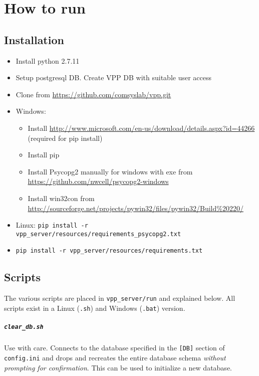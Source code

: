 


\chapter{How to run} \label{ch:how_to_run}

\section{Installation}

\begin{itemize}
	\item Install python 2.7.11
	\item Setup postgresql DB. Create VPP DB with suitable user access
	\item Clone from \url{https://github.com/comsyslab/vpp.git}


	\item Windows:
	\begin{itemize}
		\item Install \url{http://www.microsoft.com/en-us/download/details.aspx?id=44266} (required for pip install)
		\item Install pip
		\item Install Psycopg2 manually for windows with exe from \url{https://github.com/nwcell/psycopg2-windows}
		\item Install win32con from \url{http://sourceforge.net/projects/pywin32/files/pywin32/Build%20220/}
	\end{itemize}

	\item Linux: \texttt{pip install -r vpp\_server/resources/requirements\_psycopg2.txt}


	\item \texttt{pip install -r vpp\_server/resources/requirements.txt}
\end{itemize}


\section{Scripts}
The various scripts are placed in \texttt{vpp\_server/run} and explained below. All scripts exist in a Linux (\texttt{.sh}) and Windows (\texttt{.bat}) version.

\paragraph{\texttt{clear\_db.sh}}
Use with care. Connects to the database specified in the \texttt{[DB]} section of \texttt{config.ini} and drops and recreates the entire database schema \emph{without prompting for confirmation}. This can be used to initialize a new database.


